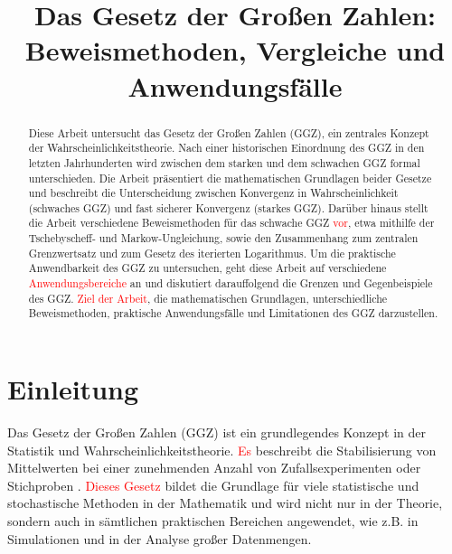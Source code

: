 \documentclass[aodsor,preprint]{imsart}
\numberwithin{equation}{section}
\theoremstyle{plain}
\begin{document}
\begin{frontmatter}
\title{Das Gesetz der Großen Zahlen: Beweismethoden,
Vergleiche und Anwendungsfälle}

\begin{abstract}
    Diese Arbeit untersucht das Gesetz der Großen Zahlen (GGZ), ein zentrales Konzept der Wahrscheinlichkeitstheorie.
    Nach einer historischen Einordnung des GGZ in den letzten Jahrhunderten wird zwischen dem starken und dem schwachen GGZ formal unterschieden.
    Die Arbeit präsentiert die mathematischen Grundlagen beider Gesetze und beschreibt die Unterscheidung zwischen Konvergenz in Wahrscheinlichkeit (schwaches GGZ) und fast sicherer Konvergenz (starkes GGZ).
    Darüber hinaus stellt die Arbeit verschiedene Beweismethoden für das schwache GGZ \textcolor{red}{vor}, etwa mithilfe der Tschebyscheff- und Markow-Ungleichung, sowie den Zusammenhang zum zentralen Grenzwertsatz und zum Gesetz des iterierten Logarithmus.
    Um die praktische Anwendbarkeit des GGZ zu untersuchen, geht diese Arbeit auf verschiedene \textcolor{red}{Anwendungsbereiche} an und diskutiert darauffolgend die Grenzen und Gegenbeispiele des GGZ.
    \textcolor{red}{Ziel der Arbeit}, die mathematischen Grundlagen, unterschiedliche Beweismethoden, praktische Anwendungsfälle und Limitationen des GGZ darzustellen.
\end{abstract}

\begin{keyword}[class=MSC]
\end{keyword}

\begin{keyword}
\kwd{\LaTeXe}
\end{keyword}

\end{frontmatter}

\section{Einleitung}
\label{sec:einleitung}
Das Gesetz der Großen Zahlen (GGZ) ist ein grundlegendes Konzept in der Statistik und Wahrscheinlichkeitstheorie.
\textcolor{red}{Es} beschreibt die Stabilisierung von Mittelwerten bei einer zunehmenden Anzahl von Zufallsexperimenten oder Stichproben \citep{degroot2021}.
\textcolor{red}{Dieses Gesetz} bildet die Grundlage für viele statistische und stochastische Methoden in der Mathematik und wird nicht nur in der Theorie, sondern auch in sämtlichen praktischen Bereichen angewendet, wie z.B. in Simulationen und in der Analyse großer Datenmengen.
\end{document}
